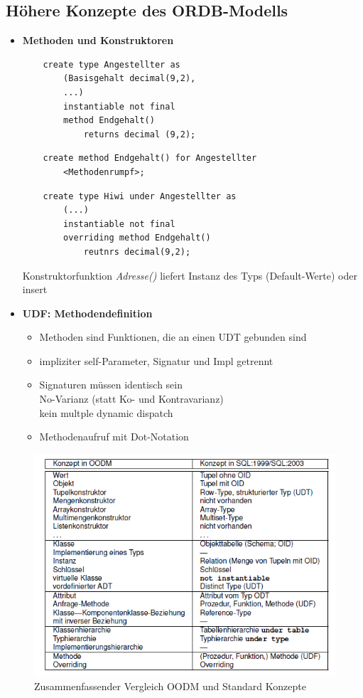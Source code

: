 \subsection{Höhere Konzepte des ORDB-Modells}
\begin{itemize}
	\item \textbf{Methoden und Konstruktoren}
	\begin{lstlisting}
	create type Angestellter as
		(Basisgehalt decimal(9,2),
		...)
		instantiable not final
		method Endgehalt()
			returns decimal (9,2);
	\end{lstlisting}
	\begin{lstlisting}
	create method Endgehalt() for Angestellter
		<Methodenrumpf>;
	\end{lstlisting}
	\begin{lstlisting}
	create type Hiwi under Angestellter as
		(...)
		instantiable not final
		overriding method Endgehalt()
			reutnrs decimal(9,2);
	\end{lstlisting}
	
	Konstruktorfunktion \textit{Adresse()} liefert Instanz des Typs (Default-Werte) oder insert
	
	\item \textbf{UDF: Methodendefinition}
	\begin{itemize}
		\item Methoden sind Funktionen, die  an einen UDT gebunden sind
		\item impliziter self-Parameter, Signatur und Impl getrennt
		\item Signaturen müssen identisch sein\\
		No-Varianz (statt Ko- und Kontravarianz)\\
		kein multple dynamic dispatch
		
		\item Methodenaufruf mit Dot-Notation
	\end{itemize}
\end{itemize}

\begin{figure}[!h]
	\centering
	\includegraphics[scale=0.6]{img/ordb_modell_summary.png}
	\caption{Zusammenfassender Vergleich OODM und Standard Konzepte}
\end{figure}

